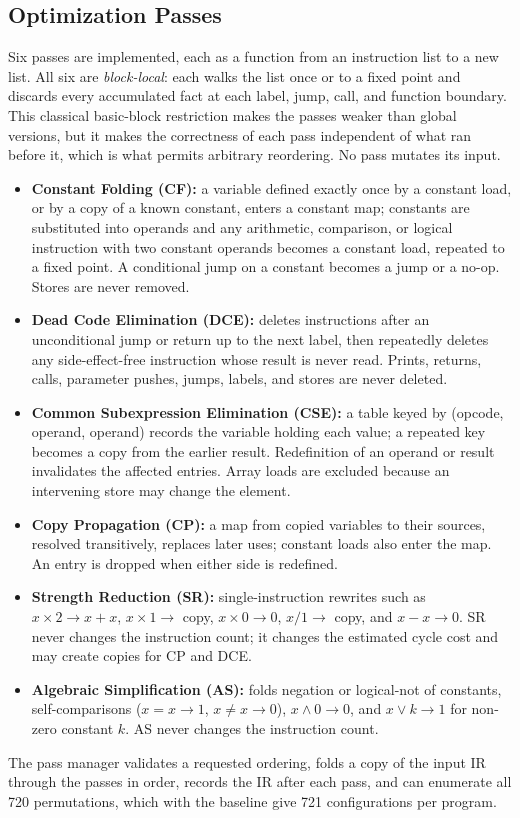 \documentclass[conference,a4paper]{IEEEtran}
\begin{document}
\subsection{Optimization Passes}
\label{sec:passes}
Six passes are implemented, each as a function from an instruction list to a new list. All six are \emph{block-local}: each walks the list once or to a fixed point and discards every accumulated fact at each label, jump, call, and function boundary. This classical basic-block restriction makes the passes weaker than global versions, but it makes the correctness of each pass independent of what ran before it, which is what permits arbitrary reordering. No pass mutates its input.
\begin{itemize}
    \item \textbf{Constant Folding (CF):} a variable defined exactly once by a constant load, or by a copy of a known constant, enters a constant map; constants are substituted into operands and any arithmetic, comparison, or logical instruction with two constant operands becomes a constant load, repeated to a fixed point. A conditional jump on a constant becomes a jump or a no-op. Stores are never removed.
    \item \textbf{Dead Code Elimination (DCE):} deletes instructions after an unconditional jump or return up to the next label, then repeatedly deletes any side-effect-free instruction whose result is never read. Prints, returns, calls, parameter pushes, jumps, labels, and stores are never deleted.
    \item \textbf{Common Subexpression Elimination (CSE):} a table keyed by (opcode, operand, operand) records the variable holding each value; a repeated key becomes a copy from the earlier result. Redefinition of an operand or result invalidates the affected entries. Array loads are excluded because an intervening store may change the element.
    \item \textbf{Copy Propagation (CP):} a map from copied variables to their sources, resolved transitively, replaces later uses; constant loads also enter the map. An entry is dropped when either side is redefined.
    \item \textbf{Strength Reduction (SR):} single-instruction rewrites such as $x \times 2 \to x + x$, $x \times 1 \to$ copy, $x \times 0 \to 0$, $x / 1 \to$ copy, and $x - x \to 0$. SR never changes the instruction count; it changes the estimated cycle cost and may create copies for CP and DCE.
    \item \textbf{Algebraic Simplification (AS):} folds negation or logical-not of constants, self-comparisons ($x = x \to 1$, $x \neq x \to 0$), $x \wedge 0 \to 0$, and $x \vee k \to 1$ for non-zero constant $k$. AS never changes the instruction count.
\end{itemize}
The pass manager validates a requested ordering, folds a copy of the input IR through the passes in order, records the IR after each pass, and can enumerate all 720 permutations, which with the baseline give 721 configurations per program.
\end{document}

